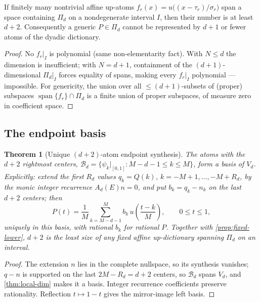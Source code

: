 \documentclass[11pt,oneside]{article}
\numberwithin{equation}{section}
\newtheorem{theorem}{Theorem}[section]
\theoremstyle{definition}
\theoremstyle{remark}
\newcommand{\Span}{\operatorname{span}}
\newcommand{\PiD}{\Pi_d}
\begin{document}
\begin{proposition}
\label{prop:fixed-lower}
If finitely many nontrivial affine up-atoms
$f_r(x)=u\bigl((x-\tau_r)/\sigma_r\bigr)$ span a space containing
$\PiD$ on a nondegenerate interval $I$, then their number is at least
$d+2$.  Consequently a generic $P\in\PiD$ cannot be represented by
$d+1$ or fewer atoms of the dyadic dictionary.
\end{proposition}

\begin{proof}
No $f_r|_I$ is polynomial (same non-elementarity fact).  With $N\le d$
the dimension is insufficient; with $N=d+1$, containment of the
$(d+1)$-dimensional $\PiD|_I$ forces equality of spans, making every
$f_r|_I$ polynomial --- impossible.  For genericity, the union over
all $\le(d+1)$-subsets of (proper) subspaces
$\Span\{f_r\}\cap\PiD$ is a finite union of proper subspaces, of
measure zero in coefficient space.
\end{proof}

\subsection{The endpoint basis}

\begin{theorem}[Unique $(d+2)$-atom endpoint synthesis]
\label{thm:endpoint-basis}
The atoms with the $d+2$ rightmost centers,
$\mathcal B_d=\{\psi_k|_{[0,1]}:M-d-1\le k\le M\}$, form a basis of
$V_d$.  Explicitly: extend the first
$R_d$ values $q_k=Q(k)$, $k=-M+1,\dots,-M+R_d$, by the monic integer
recurrence $A_d(E)n=0$, and put $b_k=q_k-n_k$ on the last $d+2$
centers; then
\begin{equation}
 \boxed{\;
 P(t)=\frac1M\sum_{k=M-d-1}^{M}b_k\,
 u\!\left(\frac{t-k}{M}\right),
 \qquad 0\le t\le1,
 \;}
 \label{eq:endpoint-rep}
\end{equation}
uniquely in this basis, with rational $b_k$ for rational $P$.
Together with \cref{prop:fixed-lower}, $d+2$ is the least size of any
fixed affine up-dictionary spanning $\PiD$ on an interval.
\end{theorem}

\begin{proof}
The extension $n$ lies in the complete nullspace, so its synthesis
vanishes; $q-n$ is supported on the last $2M-R_d=d+2$ centers, so
$\mathcal B_d$ spans $V_d$, and \cref{thm:local-dim} makes it a
basis.  Integer recurrence coefficients preserve rationality.
Reflection $t\mapsto1-t$ gives the mirror-image left basis.
\end{proof}
\end{document}
